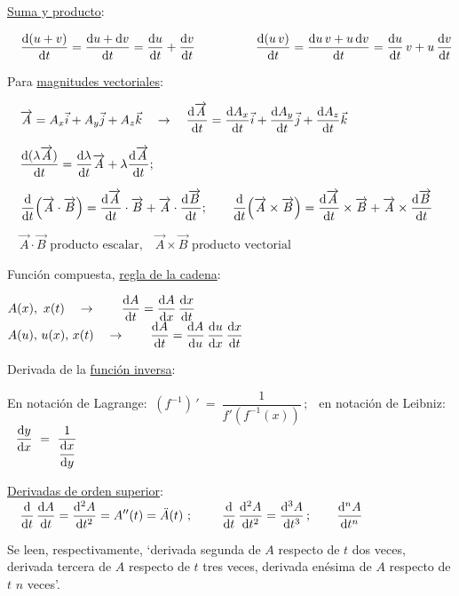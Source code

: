 \ul{Suma y producto}: 

$\quad \displaystyle \dv{(u+v)}{t}=\dfrac{\dd u + \dd v}{\dd t}=\dv{u}{t}+\dv{v}{t}$
$\qquad \qquad $
$\displaystyle \dv{(u\, v)}{t}=\dfrac{\dd u \, v+ u\, \dd v}{\dd t}=\dv{u}{t}\, v+ u\, \dv{v}{t}$

\vspace{5mm} Para \ul{magnitudes vectoriales}: 

$\quad	\overrightarrow A=A_x\vec i+A_y\vec j+A_z\vec k \quad \to \quad \displaystyle \dv{\overrightarrow A}{t}=\dv{A_x}{t}\vec i+\dv{A_y}{t}\vec j+\dv{A_z}{t}\vec k $


$\quad \displaystyle \dv{(\lambda \overrightarrow A)}{t}=\dv{\lambda}{t}\overrightarrow A+\lambda \dv{\overrightarrow A}{t};$

$\quad  \displaystyle  \dv{t} (\overrightarrow A \cdot \overrightarrow B)= \dv{\overrightarrow A}{t} \cdot \overrightarrow B + \overrightarrow A \cdot \dv{\overrightarrow B}{t}; \qquad \dv{t} (\overrightarrow A \times \overrightarrow B)= \dv{\overrightarrow A}{t} \times \overrightarrow B + \overrightarrow A \times \dv{\overrightarrow B}{t}$

\vspace{2mm} \textcolor{gris}{$\quad \overrightarrow A \cdot \overrightarrow  B \text{ producto escalar,} \quad \overrightarrow A \times \overrightarrow  B \text{ producto vectorial}$}

\vspace{5mm} Función compuesta, \ul{regla de la cadena}:

$A(x),\ x(t) \quad \to \qquad \displaystyle \dv{A}{t}=\dv{A}{x}\, \dv{x}{t}$
$\qquad \qquad \qquad $
$A(u),\, u(x),\,  x(t) \quad \to \qquad \displaystyle \dv{A}{t}=\dv{A}{u}\,  \dv{u}{x}\, \dv{x}{t}$

\vspace{5mm} Derivada de la \underline{función inversa}:

En notación de Lagrange: $\ 	\displaystyle \left( f^{-1} \right)\, ' \ = \ \dfrac 1{f'(f^{-1}(x))}\, ; \ \ $ en notación de Leibniz: $\ \ \displaystyle \dv{y}{x} \ = \ \dfrac{1}{\displaystyle \dv{x}{y}}$

\vspace{5mm} \ul{Derivadas de orden superior}:
$\quad \displaystyle \dv{t}\, \dv{A}{t}= \dv[2]{A}{t}=A''(t)=\ddot A(t) \ ; \qquad \  \dv{t}\, \dv[2]{A}{t}=\dv[3]{A}{t}\, ; \qquad \dv[n]{A}{t} $

Se leen, respectivamente, `derivada segunda de $A$ respecto de $t$ dos veces, derivada tercera de $A$ respecto de $t$ tres veces, derivada enésima de $A$ respecto de $t$ $n$ veces'.

